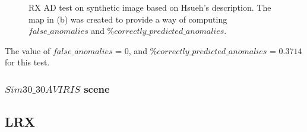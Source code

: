 \begin{figure}[H]
\begin{minipage}[]{.5\linewidth}
\end{minipage}


\caption{RX AD test on synthetic image based on Hsueh's description. The map in (b) was created to provide a way of computing $false\_anomalies$ and $ \%correctly\_predicted\_anomalies$.  }
\label{fig:hsueh_image}
\end{figure}

The value of $false\_anomalies$ = 0, and  $\%correctly\_predicted\_anomalies$ = $0.3714$ for this test.

\subsubsection{$Sim30\_30AVIRIS$ scene }




\subsection{LRX}

